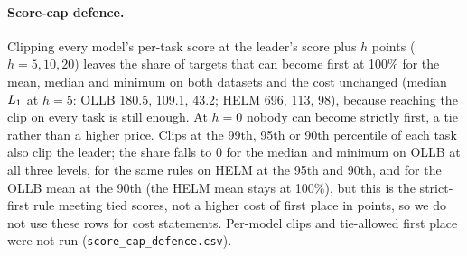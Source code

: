 \paragraph{Score-cap defence.}
Clipping every model's per-task score at the leader's score plus $h$ points ($h=5,10,20$) leaves the share of targets that can become first at 100\% for the mean, median and minimum on both datasets and the cost unchanged (median $L_1$ at $h=5$: OLLB 180.5, 109.1, 43.2; HELM 696, 113, 98), because reaching the clip on every task is still enough. At $h=0$ nobody can become strictly first, a tie rather than a higher price. Clips at the 99th, 95th or 90th percentile of each task also clip the leader; the share falls to 0 for the median and minimum on OLLB at all three levels, for the same rules on HELM at the 95th and 90th, and for the OLLB mean at the 90th (the HELM mean stays at 100\%), but this is the strict-first rule meeting tied scores, not a higher cost of first place in points, so we do not use these rows for cost statements. Per-model clips and tie-allowed first place were not run (\texttt{score\_cap\_defence.csv}).

